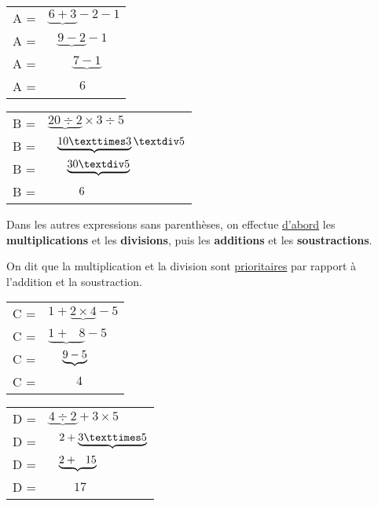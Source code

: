\documentclass[../€Cours-complet/Cours-complet]{subfiles}
\begin{document}
\begin{exemple}
	\begin{minipage}{0.5\textwidth}
		\begin{tabular}{ll}
			A = & $\underbrace{6 + 3} - 2 - 1 $          \\
			A = & $\phantom{6\ }\underbrace{9 - 2} - 1 $ \\
			A = & $\phantom{6 +\ }\underbrace{7 - 1}$    \\
			A = & $\phantom{6 + 3\ }6$
		\end{tabular}
	\end{minipage}
	\begin{minipage}{0.5\textwidth}
		\begin{tabular}{ll}
			B = & $\underbrace{20 ÷ 2} × 3 ÷ 5 $           \\
			B = & $\hspace{0.8em}\underbrace{10 × 3} ÷ 5 $ \\
			B = & $\hspace{1.7em}\underbrace{30 ÷ 5}$      \\
			B = & $\hspace{2.8em}6$
		\end{tabular}
	\end{minipage}
\end{exemple}

\begin{cours}
	Dans les autres expressions sans parenthèses, on effectue \uline{d'abord} les \textbf{multiplications} et les \textbf{divisions}, puis les \textbf{additions} et les \textbf{soustractions}.

	On dit que la multiplication et la division sont \uline{prioritaires} par rapport à l'addition et la soustraction.
\end{cours}

\begin{exemple}
	\begin{minipage}{0.5\textwidth}
		\begin{tabular}{ll}
			C = & $1 + \underbrace{2 × 4} - 5$           \\
			C = & $\underbrace{1 + \phantom{2\ }8} - 5 $ \\
			C = & $\hspace{1.3em}\underbrace{9 - 5}$     \\
			C = & $\phantom{1 + 8}4$
		\end{tabular}
	\end{minipage}
	\begin{minipage}{0.5\textwidth}
		\begin{tabular}{ll}
			D = & $\underbrace{4 ÷ 2} + 3 × 5$                      \\
			D = & $\hspace{0.9em}2 + \underbrace{3 × 5}$            \\
			D = & $\hspace{0.9em}\underbrace{2 + \hspace{0.7em}15}$ \\
			D = & $\hspace{2em}17$
		\end{tabular}
	\end{minipage}
\end{exemple}
\end{document}
